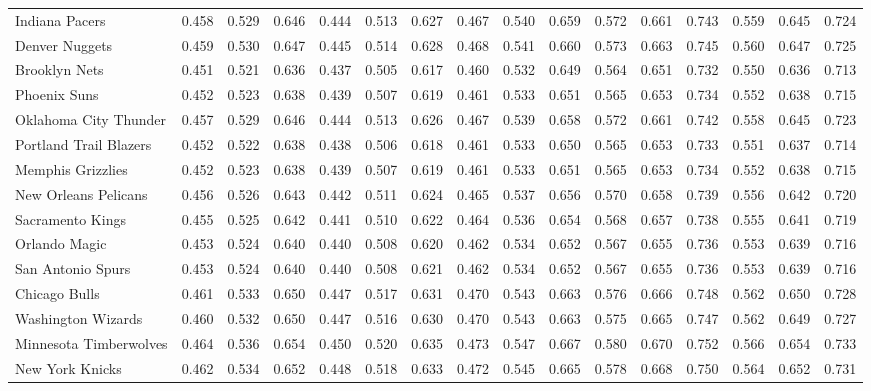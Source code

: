 \documentclass[11pt,a4paper]{article}
\begin{document}
\begin{table}[H]
\begin{tabular}{l ccc ccc ccc ccc ccc}
Indiana Pacers & 0.458 & 0.529 & 0.646 & 0.444 & 0.513 & 0.627 & 0.467 & 0.540 & 0.659 & 0.572 & 0.661 & 0.743 & 0.559 & 0.645 & 0.724 \\
Denver Nuggets & 0.459 & 0.530 & 0.647 & 0.445 & 0.514 & 0.628 & 0.468 & 0.541 & 0.660 & 0.573 & 0.663 & 0.745 & 0.560 & 0.647 & 0.725 \\
Brooklyn Nets & 0.451 & 0.521 & 0.636 & 0.437 & 0.505 & 0.617 & 0.460 & 0.532 & 0.649 & 0.564 & 0.651 & 0.732 & 0.550 & 0.636 & 0.713 \\
Phoenix Suns & 0.452 & 0.523 & 0.638 & 0.439 & 0.507 & 0.619 & 0.461 & 0.533 & 0.651 & 0.565 & 0.653 & 0.734 & 0.552 & 0.638 & 0.715 \\
Oklahoma City Thunder & 0.457 & 0.529 & 0.646 & 0.444 & 0.513 & 0.626 & 0.467 & 0.539 & 0.658 & 0.572 & 0.661 & 0.742 & 0.558 & 0.645 & 0.723 \\
Portland Trail Blazers & 0.452 & 0.522 & 0.638 & 0.438 & 0.506 & 0.618 & 0.461 & 0.533 & 0.650 & 0.565 & 0.653 & 0.733 & 0.551 & 0.637 & 0.714 \\
Memphis Grizzlies & 0.452 & 0.523 & 0.638 & 0.439 & 0.507 & 0.619 & 0.461 & 0.533 & 0.651 & 0.565 & 0.653 & 0.734 & 0.552 & 0.638 & 0.715 \\
New Orleans Pelicans & 0.456 & 0.526 & 0.643 & 0.442 & 0.511 & 0.624 & 0.465 & 0.537 & 0.656 & 0.570 & 0.658 & 0.739 & 0.556 & 0.642 & 0.720 \\
Sacramento Kings & 0.455 & 0.525 & 0.642 & 0.441 & 0.510 & 0.622 & 0.464 & 0.536 & 0.654 & 0.568 & 0.657 & 0.738 & 0.555 & 0.641 & 0.719 \\
Orlando Magic & 0.453 & 0.524 & 0.640 & 0.440 & 0.508 & 0.620 & 0.462 & 0.534 & 0.652 & 0.567 & 0.655 & 0.736 & 0.553 & 0.639 & 0.716 \\
San Antonio Spurs & 0.453 & 0.524 & 0.640 & 0.440 & 0.508 & 0.621 & 0.462 & 0.534 & 0.652 & 0.567 & 0.655 & 0.736 & 0.553 & 0.639 & 0.716 \\
Chicago Bulls & 0.461 & 0.533 & 0.650 & 0.447 & 0.517 & 0.631 & 0.470 & 0.543 & 0.663 & 0.576 & 0.666 & 0.748 & 0.562 & 0.650 & 0.728 \\
Washington Wizards & 0.460 & 0.532 & 0.650 & 0.447 & 0.516 & 0.630 & 0.470 & 0.543 & 0.663 & 0.575 & 0.665 & 0.747 & 0.562 & 0.649 & 0.727 \\
Minnesota Timberwolves & 0.464 & 0.536 & 0.654 & 0.450 & 0.520 & 0.635 & 0.473 & 0.547 & 0.667 & 0.580 & 0.670 & 0.752 & 0.566 & 0.654 & 0.733 \\
New York Knicks & 0.462 & 0.534 & 0.652 & 0.448 & 0.518 & 0.633 & 0.472 & 0.545 & 0.665 & 0.578 & 0.668 & 0.750 & 0.564 & 0.652 & 0.731 \\

\end{tabular}
\end{table}
\end{document}

